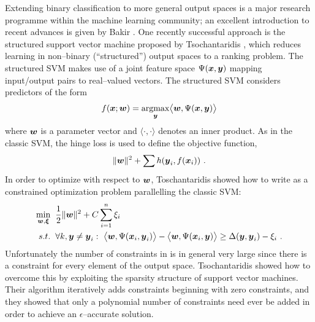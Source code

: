 Extending binary classification to more general output spaces is a
major research programme within the machine learning community; an
excellent introduction to recent advances is given by Bakir \etal
\cite{Bakir07}. One recently successful approach is the structured
support vector machine proposed by Tsochantaridis \etal
\cite{Tsochantaridis04}, which reduces learning in non--binary
(``structured'') output spaces to a ranking problem. The structured
SVM makes use of a joint feature space $\JointFtr(\inp,\outp)$ mapping
input/output pairs to real--valued vectors. The structured SVM
considers predictors of the form
\begin{equation}
  \Predictor(\inp;\Model) 
  = 
  \argmax_{\outp}\limits 
  \bigl\langle \Model, \JointFtr(\inp,\outp) \bigr\rangle
  \label{eq:linear-max}
\end{equation}
where $\Model$ is a parameter vector and $\langle\cdot,\cdot\rangle$
denotes an inner product. As in the classic SVM, the hinge loss is
used to define the objective function,
\begin{equation}
  \label{eq:first-ssvm}
  \|\Model\|^2 + \sum h(\outp_i, \Predictor(\inp_i)) ~.
\end{equation}
In order to optimize with respect to $\Model$, Toschantaridis \etal
showed how to write  as a constrained optimization
problem parallelling the classic SVM:
\begin{equation}
  \begin{split}
    \min_{\Model,\Slacks} &
      \hspace{2mm} 
    \frac{1}{2} \|\Model\|^2 +
      C \sum_{i=1}^n \Slack_i\\
    s.t. & \hspace{2mm} 
      \forall k, \outp \neq \outp_i:~
        \bigl\langle\Model, \JointFtr(\inp_i,\outp_i)\bigr\rangle -
        \bigl\langle\Model, \JointFtr(\inp_i,\outp)\bigr\rangle
      \geq
        \Loss(\outp,\outp_i) - \Slack_i ~.
  \end{split}
  \label{eq:ssvm}
\end{equation}
Unfortunately the number of constraints in  is in general
very large since there is a constraint for every element of the output
space. Tsochantaridis \etal \cite{Tsochantaridis04} showed how to
overcome this by exploiting the sparsity structure of support vector
machines. Their algorithm iteratively adds constraints beginning with
zero constraints, and they showed that only a polynomial number of
constraints need ever be added in order to achieve an
$\epsilon$--accurate solution.

